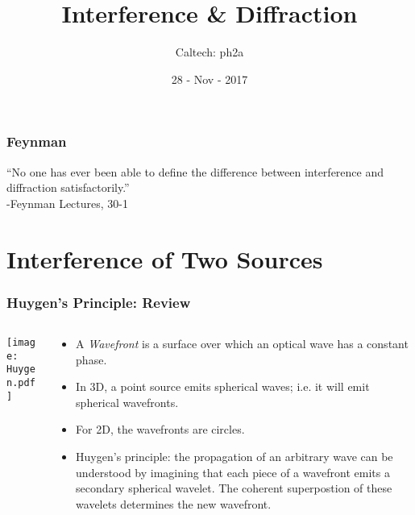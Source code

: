 \documentclass[pdf, handout, hideothersubsections]{beamer}
\begin{document}
\title{Interference \& Diffraction}  
\author{Caltech: ph2a}
\date{28 - Nov - 2017}


\frame{\titlepage} 



\begin{frame}
\frametitle{Feynman}

\centering
``No one has ever been able to define the difference between
interference and diffraction satisfactorily.'' \\

-Feynman Lectures, 30-1

\end{frame}

\section{Interference of Two Sources}
\begin{frame}
\frametitle{Huygen's Principle: Review}
\begin{columns}
  \begin{column}{0.3\textwidth}
    \texttt{[image: Huygen.pdf]}
  \end{column}

  \begin{column}{0.7\textwidth}
    \begin{itemize}
    \item A \emph{Wavefront} is a surface over which an optical wave has a
      constant phase.

    \item In 3D, a point source emits spherical waves; i.e. it will emit
      spherical wavefronts.

    \item For 2D, the wavefronts are circles.

    \item Huygen's principle: the propagation of an arbitrary wave can be
      understood by imagining that each piece of a wavefront emits a
      secondary spherical wavelet.
      The coherent superpostion of
      these wavelets determines the new wavefront.
    \end{itemize}
  \end{column}
\end{columns}
\end{frame}
\end{document}
